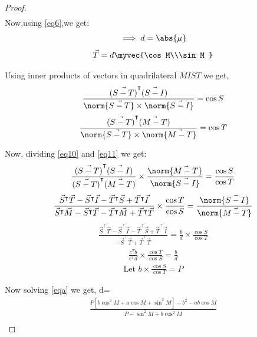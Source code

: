 \documentclass[journal,12pt,twocolumn]{IEEEtran}
\begin{document}
\begin{enumerate}
\begin{proof}
\begin{align}
\end{align}
Now,using  \eqref{eq6},we get:
\begin{align}
\implies d=\abs{\mu}
\end{align}
\begin{align}
\vec{T}=d \myvec{\cos M\\\sin M } \label{eq9}
\end{align}
\item Using inner products of vectors in quadrilateral $MIST$ we get,
\begin{align}
\frac{\vec{(S-T)}^\intercal\vec{(S-I)}}{\norm{\vec{S-T}}\times\norm{\vec{S-I}}}=\cos S \label{eq10}
\end{align}
\begin{align}
\frac{\vec{(S-T)}^\intercal\vec{(M-T)}}{\norm{\vec{S-T}}\times\norm{\vec{M-T}}}=\cos T \label{eq11}
\end{align}
\item Now, dividing \eqref{eq10} and \eqref{eq11} we get:
\begin{align}
\frac{\vec{(S-T)}^\intercal\vec{(S-I)}} {\vec{(S-T)}^\intercal\vec{(M-T)}} \times \frac{\norm{\vec{M-T}}}{\norm{\vec{S-I}}}=\frac{\cos S}{\cos T} 
\end{align}
\begin{align}
\frac{\vec{S}^\intercal\vec{T}-\vec{S}^\intercal \vec{I}-\vec{T}^\intercal\vec{S}+\vec{T}^\intercal \vec{I}}{\vec{S}^\intercal\vec{M}-\vec{S}^\intercal \vec{T}-\vec{T}^\intercal\vec{M}+\vec{T}^\intercal \vec{T}}\times\frac{\cos T}{\cos S}= \frac{\norm{\vec{S-I}}}{\norm{\vec{M-T}}}
\end{align}
\begin{align}
\frac{\vec{S}^\intercal \vec{T}-\vec{S}^\intercal \vec{I}-\vec{T}^\intercal\vec{S}+\vec{T}^\intercal \vec{I}}{-\vec{S}^\intercal \vec{T}+\vec{T}^\intercal \vec{T}} = \frac{b}{d}\times \frac{\cos S}{\cos T} \label{eqa}
\end{align}
\begin{align}
\frac{c^Tb}{c^T d} \times \frac{\cos T}{\cos S} =\frac{b}{d}
\end{align}
\begin{align}
\text{Let } b\times \frac{\cos S}{\cos T} = P
\end{align}
\item Now solving \eqref{eqa} we get, d=
\begin{align}
\frac{P[b\cos^2M +a\cos M+\sin^2M]-b^2-ab\cos M} {P-\sin^2M +b\cos^2M}  \label{eqb} 
\end{align}
\begin{align}

\end{align}
\end{proof}
\end{enumerate}
\end{document}
